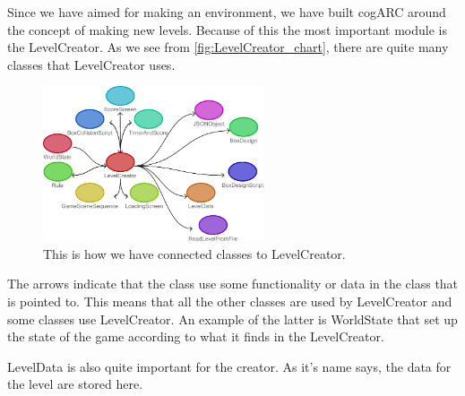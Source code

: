 


Since we have aimed for making an environment, we have built cogARC around 
the concept of making new levels. Because of this the most important module 
is the LevelCreator. As we see from \autoref{fig:LevelCreator_chart}, there
are quite many classes that LevelCreator uses.

\begin{figure}
	\capstart
	\centering
	\vspace{-5pt}
	\includegraphics[width=0.58\textwidth]{images/LevelCreator_class_connectivity}
	\caption[LevelCreator class chart]{This is how we have connected classes to LevelCreator.}
	\label{fig:LevelCreator_chart}
	\vspace{-10pt}
\end{figure}

The arrows indicate that the class use some functionality or data in the 
class that is pointed to. This means that all the other classes are used by
LevelCreator and some classes use LevelCreator. An example of the latter is 
WorldState that set up the state of the game according to what it finds in the
LevelCreator.

LevelData is also quite important for the creator. As it's name says, the data
for the level are stored here.




